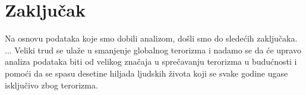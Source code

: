 \documentclass[a4paper]{article}
\begin{document}
\newpage
\section{Zaključak}
\label{sec:zakljucak}
Na osnovu podataka koje smo dobili analizom, došli smo do sledećih zaključaka.
...
Veliki trud se ulaže u smanjenje globalnog terorizma i nadamo se da će upravo analiza podataka biti od velikog značaja u sprečavanju terorizma u budućnosti i pomoći da se spasu desetine hiljada ljudskih života koji se svake godine ugase isključivo zbog terorizma.

\appendix
 

\end{document}
